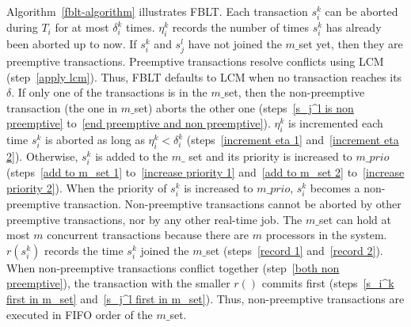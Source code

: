 \documentclass[conference,letterpaper]{IEEEtran}
\begin{document}
Algorithm~\ref{fblt-algorithm} illustrates FBLT. Each transaction $s_{i}^{k}$ can be aborted during $T_i$ for at most $\delta_{i}^{k}$ times. $\eta_{i}^{k}$ records  the number of times $s_{i}^{k}$ has already been aborted up to now. If $s_i^k$ and $s_j^l$ have not joined the $m\_$set yet, then they are preemptive transactions. Preemptive transactions resolve conflicts using LCM~\cite{lcmdac2012} (step~\ref{apply lcm}). Thus, FBLT defaults to LCM when no transaction reaches its $\delta$. If only one of the transactions is in the $m\_$set, then the non-preemptive transaction (the one in $m\_$set) aborts the other one (steps~\ref{s_j^l is non preemptive} to~\ref{end preemptive and non preemptive}). $\eta_i^k$ is incremented each time $s_i^k$ is aborted as long as $\eta_i^k < \delta_i^k$ (steps~\ref{increment eta 1} and~\ref{increment eta 2}). Otherwise, $s_i^k$ is added to the $m\_$ set and its priority is increased to $m\_prio$ (steps~\ref{add to m_set 1} to~\ref{increase priority 1} and~\ref{add to m_set 2} to~\ref{increase priority 2}). When the priority of $s_i^k$ is increased to $m\_prio$, $s_i^k$ becomes a non-preemptive transaction. Non-preemptive transactions cannot be aborted by other preemptive transactions, nor by any other real-time job. The $m\_$set can hold at most $m$ concurrent transactions because there are $m$ processors in the system. $r(s_i^k)$ records the time $s_i^k$ joined the $m\_$set (steps~\ref{record 1} and~\ref{record 2}). When non-preemptive transactions conflict together (step~\ref{both non preemptive}), the transaction with the smaller $r()$ commits first (steps~\ref{s_i^k first in m_set} and~\ref{s_j^l first in m_set}). Thus, non-preemptive transactions are executed in FIFO order of the $m\_$set.
\end{document}
